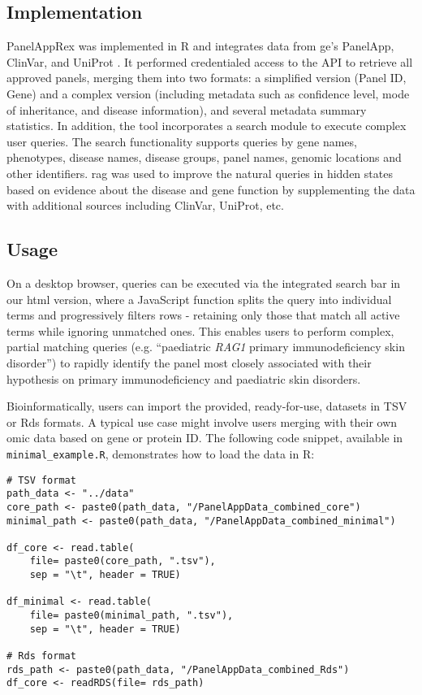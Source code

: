 \subsection{Implementation}
\noindent
PanelAppRex was implemented in R and integrates data from \ac{ge}’s PanelApp, ClinVar, and UniProt
\cite{martin_panelapp_2019,
landrum_clinvar_2018, the_uniprot_consortium_uniprot_2025}. 
It performed credentialed access to the API to retrieve all approved panels, merging them into two formats: a simplified version (Panel ID, Gene) and a complex version (including metadata such as confidence level, mode of inheritance, and disease information), and several metadata summary statistics. In addition, the tool incorporates a search module to execute complex user queries. The search functionality supports queries by gene names, phenotypes, disease names, disease groups, panel names, genomic locations and other identifiers. 
\ac{rag} was used to improve the natural queries in hidden states based on evidence about the disease and gene function by supplementing the data with additional sources including ClinVar, UniProt, etc. 

\subsection{Usage}
\noindent
On a desktop browser, queries can be executed via the integrated search bar in our \ac{html} version, where a JavaScript function splits the query into individual terms and progressively filters rows - retaining only those that match all active terms while ignoring unmatched ones. This enables users to perform complex, partial matching queries (e.g. ``paediatric \textit{RAG1} primary immunodeficiency skin disorder'') to rapidly identify the panel most closely associated with their hypothesis on primary immunodeficiency and paediatric skin disorders.

Bioinformatically, users can import the provided, ready-for-use, datasets in TSV or Rds formats. 
A typical use case might involve users merging with their own omic data based on gene or protein ID.
The following code snippet, available in \texttt{minimal\_example.R}, demonstrates how to load the data in R:
\begin{verbatim}
# TSV format
path_data <- "../data"
core_path <- paste0(path_data, "/PanelAppData_combined_core")
minimal_path <- paste0(path_data, "/PanelAppData_combined_minimal")

df_core <- read.table(
    file= paste0(core_path, ".tsv"), 
    sep = "\t", header = TRUE)

df_minimal <- read.table(
    file= paste0(minimal_path, ".tsv"), 
    sep = "\t", header = TRUE)

# Rds format
rds_path <- paste0(path_data, "/PanelAppData_combined_Rds")
df_core <- readRDS(file= rds_path)
\end{verbatim}

